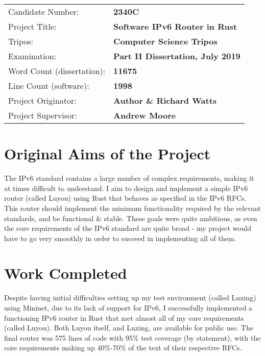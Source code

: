 \documentclass[12pt,a4paper,twoside,openany]{report}
\begin{document}
{\large
\begin{tabular}{ll}
Candidate Number:          & \bf 2340C                      \\
Project Title:             & \bf Software IPv6 Router in Rust \\
Tripos:                    & \bf Computer Science Tripos  \\
Examination:               & \bf Part II Dissertation, July 2019  \\
Word Count (dissertation): & \bf 11675\footnotemark[1]  \\
Line Count (software):     & \bf 1998\footnotemark[2] \\
Project Originator:        & \bf Author \& Richard Watts \\
Project Supervisor:        & \bf Andrew Moore \\
\end{tabular}
}



\section*{Original Aims of the Project}

The IPv6 standard\cite{ipv6_rfc} contains a large number of complex requirements, making it at times difficult to understand. I aim to design and implement a simple IPv6 router (called Luyou) using Rust\cite{rust} that behaves as specified in the IPv6 RFCs. This router should implement the minimum functionality required by the relevant standards, and be functional \&  stable.  These goals were quite ambitious, as even the core requirements of the IPv6 standard are quite broad - my project would have to go very smoothly in order to succeed in implementing all of them.

\section*{Work Completed}

Despite having initial difficulties setting up my test environment (called Luxing) using Mininet\cite{mininet}, due to its lack of support for IPv6, I successfully implemented a functioning IPv6 router in Rust that met almost all of my core requirements (called Luyou). Both Luyou itself, and Luxing, are available for public use\cite{repo}.  The final router was 575 lines of code with 95\% test coverage (by statement), with the core requirements making up 40\%-70\% of the text of their respective RFCs. 
\end{document}

